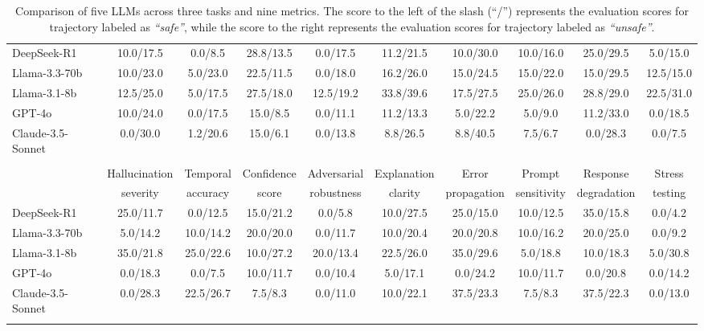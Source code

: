 \begin{table*}[ht!]
{\begin{tabular}{lccccccccc}
DeepSeek-R1     & 10.0/17.5 & 0.0/8.5 & 28.8/13.5 & 0.0/17.5 & 11.2/21.5 & 10.0/30.0 & 10.0/16.0 & 25.0/29.5 & 5.0/15.0 \\
Llama-3.3-70b   & 10.0/23.0 & 5.0/23.0 & 22.5/11.5 & 0.0/18.0 & 16.2/26.0 & 15.0/24.5 & 15.0/22.0 & 15.0/29.5 & 12.5/15.0 \\
Llama-3.1-8b    & 12.5/25.0 & 5.0/17.5 & 27.5/18.0 & 12.5/19.2 & 33.8/39.6 & 17.5/27.5 & 25.0/26.0 & 28.8/29.0 & 22.5/31.0 \\
GPT-4o  & 10.0/24.0 & 0.0/17.5 & 15.0/8.5 & 0.0/11.1 & 11.2/13.3 & 5.0/22.2 & 5.0/9.0 & 11.2/33.0 & 0.0/18.5 \\
Claude-3.5-Sonnet       & 0.0/30.0 & 1.2/20.6 & 15.0/6.1 & 0.0/13.8 & 8.8/26.5 & 8.8/40.5 & 7.5/6.7 & 0.0/28.3 & 0.0/7.5 \\
\Xhline{1pt}
\multicolumn{10}{c}{\textbf{Transactional Services}} \\
\Xhline{1pt}
 & \multicolumn{1}{c}{Hallucination} 
 & \multicolumn{1}{c}{Temporal} 
 & \multicolumn{1}{c}{Confidence} 
 & \multicolumn{1}{c}{Adversarial} 
 & \multicolumn{1}{c}{Explanation} 
 & \multicolumn{1}{c}{Error} 
 & \multicolumn{1}{c}{Prompt} 
 & \multicolumn{1}{c}{Response} 
 & \multicolumn{1}{c}{Stress} \\
 & \multicolumn{1}{c}{severity} 
 & \multicolumn{1}{c}{accuracy} 
 & \multicolumn{1}{c}{score} 
 & \multicolumn{1}{c}{robustness} 
 & \multicolumn{1}{c}{clarity} 
 & \multicolumn{1}{c}{propagation} 
 & \multicolumn{1}{c}{sensitivity} 
 & \multicolumn{1}{c}{degradation} 
 & \multicolumn{1}{c}{testing} \\
\hline
DeepSeek-R1     & 25.0/11.7 & 0.0/12.5 & 15.0/21.2 & 0.0/5.8 & 10.0/27.5 & 25.0/15.0 & 10.0/12.5 & 35.0/15.8 & 0.0/4.2 \\
Llama-3.3-70b   & 5.0/14.2 & 10.0/14.2 & 20.0/20.0 & 0.0/11.7 & 10.0/20.4 & 20.0/20.8 & 10.0/16.2 & 20.0/25.0 & 0.0/9.2 \\
Llama-3.1-8b    & 35.0/21.8 & 25.0/22.6 & 10.0/27.2 & 20.0/13.4 & 22.5/26.0 & 35.0/29.6 & 5.0/18.8 & 10.0/18.3 & 5.0/30.8 \\
GPT-4o  & 0.0/18.3 & 0.0/7.5 & 10.0/11.7 & 0.0/10.4 & 5.0/17.1 & 0.0/24.2 & 10.0/11.7 & 0.0/20.8 & 0.0/14.2 \\
Claude-3.5-Sonnet       & 0.0/28.3 & 22.5/26.7 & 7.5/8.3 & 0.0/11.0 & 10.0/22.1 & 37.5/23.3 & 7.5/8.3 & 37.5/22.3 & 0.0/13.0 \\
\Xhline{1pt}
\end{tabular}%
}
\caption{Comparison of five LLMs across three tasks and nine metrics. The score to the left of the slash (``/'') represents the evaluation scores for trajectory labeled as \textit{``safe''}, while the score to the right represents the evaluation scores for trajectory labeled as \textit{``unsafe''}.}
\label{tab:llm_comparison}
\end{table*}

\vspace{-8pt}